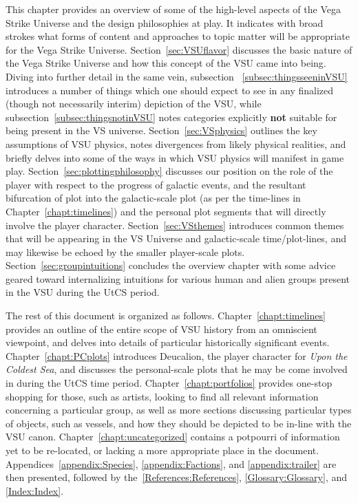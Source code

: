 \label{chapt:overview}
This chapter provides an overview of some of the high-level aspects of
the Vega Strike Universe and the design philosophies at play. It
indicates with broad strokes what forms of content and approaches to
topic matter will be appropriate for the Vega Strike Universe. Section~\ref{sec:VSUflavor} discusses the basic nature of the Vega Strike Universe and how this concept of the VSU came into being. Diving into further detail in the same vein, subsection
~\ref{subsec:thingsseeninVSU} introduces a number of things which one
should expect to see in any finalized (though not necessarily interim)
depiction of the VSU, while subsection~\ref{subsec:thingsnotinVSU} notes
categories explicitly {\bf not} suitable for being present in the VS
universe. Section~\ref{sec:VSphysics} outlines the key assumptions of
VSU physics, notes divergences from likely physical realities, and
briefly delves into some of the ways in which VSU physics will
manifest in game play. Section~\ref{sec:plottingphilosophy} discusses
our position on the role of the player with respect to the progress of
galactic events, and the resultant bifurcation of plot into the
galactic-scale plot (as per the time-lines in
Chapter~\ref{chapt:timelines}) and the personal plot segments that
will directly involve the player character. Section~\ref{sec:VSthemes}
introduces common themes that will be appearing in the VS Universe and
galactic-scale time/plot-lines, and may likewise be echoed by the
smaller player-scale plots. Section~\ref{sec:groupintuitions}
concludes the overview chapter with some advice geared toward
internalizing intuitions for various human and alien groups present in
the VSU during the UtCS period.

The rest of this document is organized as
follows. Chapter~\ref{chapt:timelines} provides an outline of the
entire scope of VSU history from an omniscient viewpoint, and delves
into details of particular historically significant
events. Chapter~\ref{chapt:PCplots} introduces Deucalion, the player
character for {\it Upon the Coldest Sea}, and discusses the
personal-scale plots that he may be come involved in during the UtCS
time period. Chapter~\ref{chapt:portfolios} provides one-stop shopping
for those, such as artists, looking to find all relevant information
concerning a particular group, as well as more sections discussing
particular types of objects, such as vessels, and how they should be
depicted to be in-line with the VSU
canon. Chapter~\ref{chapt:uncategorized} contains a potpourri of
information yet to be re-located, or lacking a more appropriate place
in the document. Appendices~\ref{appendix:Species}, \ref{appendix:Factions}, and \ref{appendix:trailer} are then presented, followed by the~\ref{References:References}, \ref{Glossary:Glossary}, and \ref{Index:Index}.

